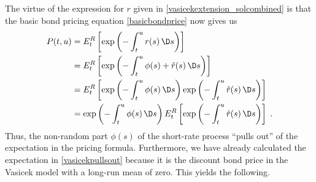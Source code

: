 The virtue of the expression for $r$ given in \eqref{vasicekextension_solcombined} is that the basic bond pricing equation \eqref{basicbondprice} now gives us
\begin{align}
P(t,u) &= E^R_t \left[ \exp\left(-\int_t^u r(s)\,\D s\right)\right]\notag\\
&= E^R_t \left[ \exp\left(-\int_t^u \phi(s) + \hat{r}(s)\,\D s\right)\right]\notag\\
&= E^R_t \left[ \exp\left(-\int_t^u \phi(s)\,\D s\right)\exp\left(-\int_t^u  \hat{r}(s)\,\D s\right)\right]\notag\\
&= \exp\left(-\int_t^u \phi(s)\,\D s\right)E^R_t \left[ \exp\left(-\int_t^u \hat{r}(s)\,\D s\right)\right]\;.\label{vasicekpullsout}
\end{align}
Thus, the non-random part $\phi(s)$ of the short-rate process ``pulls out'' of the expectation in the pricing formula.  Furthermore, we have already calculated the expectation in \eqref{vasicekpullsout} because it is the discount bond price in the Vasicek model with a long-run mean of zero.  This yields the following.



